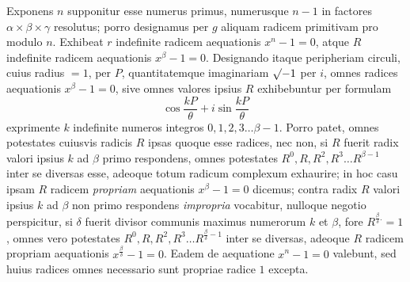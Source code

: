 Exponens $n$ supponitur esse numerus primus, numerusque $n-1$ in factores $\alpha\times\beta\times\gamma$ resolutus; porro designamus per $g$ aliquam radicem primitivam pro modulo $n$. Exhibeat $r$ indefinite radicem aequationis $x^n-1=0$, atque $R$ indefinite radicem aequationis $x^\beta-1=0$. Designando itaque peripheriam circuli, cuius radius $=1$, per $P$, quantitatemque imaginariam $\mathord{\surd}{-1}$ per $i$, omnes radices aequationis $x^\beta-1=0$, sive omnes valores ipsius $R$ exhibebuntur per formulam
\[
\cos\frac{kP}{\theta}+i\sin\frac{kP}{\theta}
\]
exprimente $k$ indefinite numeros integros $0,1,2,3\ldots\beta-1$. Porro patet, omnes potestates cuiusvis radicis $R$ ipsas quoque esse radices, nec non, si $R$ fuerit radix valori ipsius $k$ ad $\beta$ primo respondens, omnes potestates $R^0,R,R^2,R^3\ldots R^{\beta-1}$ inter se diversas esse, adeoque totum radicum complexum exhaurire; in hoc casu ipsam $R$ radicem \emph{propriam} aequationis $x^\beta-1=0$ dicemus; contra radix $R$ 
%
valori ipsius $k$ ad $\beta$ non primo respondens \emph{impropria} vocabitur, nulloque negotio perspicitur, si $\delta$ fuerit divisor communis maximus numerorum $k$ et $\beta$, fore $R^{\frac\beta\delta .}=1$, omnes vero potestates $R^0,R,R^2,R^3\ldots R^{\frac\beta\delta-1}$ inter se diversas, adeoque $R$ radicem propriam aequationis $x^{\frac\beta\delta}-1=0$. Eadem de aequatione $x^n-1=0$ valebunt, sed huius radices omnes necessario sunt propriae radice $1$ excepta.

